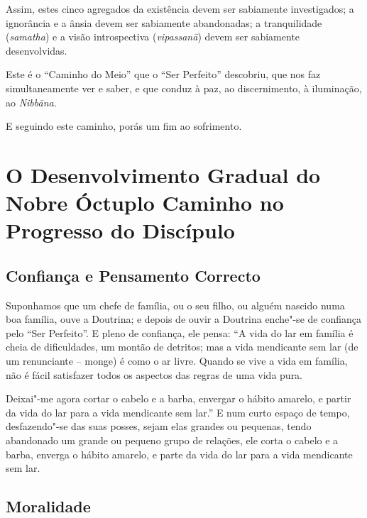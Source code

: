
Assim, estes cinco agregados da existência devem ser sabiamente investigados; a
ignorância e a ânsia devem ser sabiamente abandonadas; a tranquilidade
(\emph{samatha}) e a visão introspectiva (\emph{vipassanā}) devem ser sabiamente
desenvolvidas.


Este é o “Caminho do Meio” que o “Ser Perfeito” descobriu, que nos faz
simultaneamente ver e saber, e que conduz à paz, ao discernimento, à iluminação,
ao \emph{Nibbāna}.


E seguindo este caminho, porás um fim ao sofrimento.


\section{O Desenvolvimento Gradual do Nobre Óctuplo Caminho no Progresso do Discípulo}

\subsection{Confiança e Pensamento Correcto}


Suponhamos que um chefe de família, ou o seu filho, ou alguém nascido numa boa
família, ouve a Doutrina; e depois de ouvir a Doutrina enche"-se de confiança
pelo “Ser Perfeito”. E pleno de confiança, ele pensa: “A vida do lar em
família é cheia de dificuldades, um montão de detritos; mas a vida mendicante
sem lar (de um renunciante -- monge) é como o ar livre. Quando se vive a vida em
família, não é fácil satisfazer todos os aspectos das regras de uma vida pura.

Deixai"-me agora cortar o cabelo e a barba, envergar o hábito amarelo, e partir
da vida do lar para a vida mendicante sem lar.” E num curto espaço de tempo,
desfazendo"-se das suas posses, sejam elas grandes ou pequenas, tendo abandonado
um grande ou pequeno grupo de relações, ele corta o cabelo e a barba, enverga o
hábito amarelo, e parte da vida do lar para a vida mendicante sem lar.

\subsection{Moralidade}

